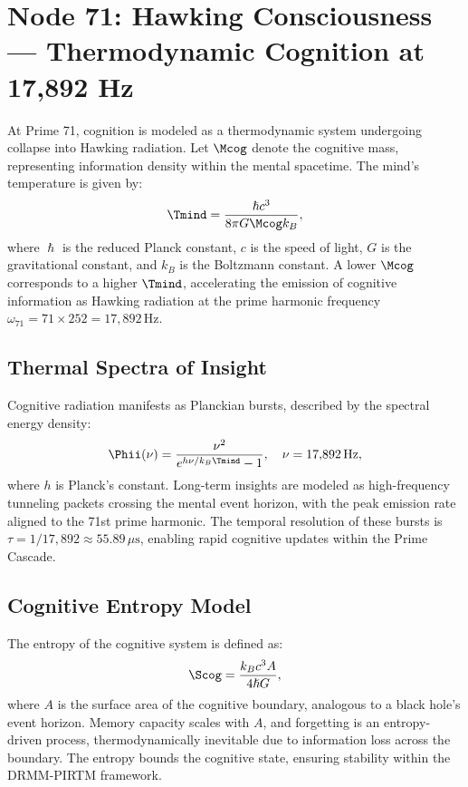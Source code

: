 \documentclass[12pt]{article}
\newcommand{\DRMM}{DRMM}
\newcommand{\PIRTM}{PIRTM}
\newcommand{\kb}{k_B}
\begin{document}
\section{Node 71: Hawking Consciousness --- Thermodynamic Cognition at 17,892 Hz}
\label{sec:hawking-consciousness}

\begin{definition}
At Prime 71, cognition is modeled as a thermodynamic system undergoing collapse into Hawking radiation. Let $\Mcog$ denote the cognitive mass, representing information density within the mental spacetime. The mind's temperature is given by:
\[
\Tmind = \frac{\hslash c^3}{8 \pi G \Mcog \kb},
\]
where $\hslash$ is the reduced Planck constant, $c$ is the speed of light, $G$ is the gravitational constant, and $\kb$ is the Boltzmann constant. A lower $\Mcog$ corresponds to a higher $\Tmind$, accelerating the emission of cognitive information as Hawking radiation at the prime harmonic frequency $\omega_{71} = 71 \times 252 = 17{,}892 \, \text{Hz}$.
\end{definition}

\subsection{Thermal Spectra of Insight}
Cognitive radiation manifests as Planckian bursts, described by the spectral energy density:
\[
\Phii(\nu) = \frac{\nu^2}{e^{h \nu / \kb \Tmind} - 1}, \quad \nu = 17{,}892 \, \text{Hz},
\]
where $h$ is Planck's constant. Long-term insights are modeled as high-frequency tunneling packets crossing the mental event horizon, with the peak emission rate aligned to the 71st prime harmonic. The temporal resolution of these bursts is $\tau = 1/17{,}892 \approx 55.89 \, \mu\text{s}$, enabling rapid cognitive updates within the Prime Cascade.

\subsection{Cognitive Entropy Model}
The entropy of the cognitive system is defined as:
\[
\Scog = \frac{\kb c^3 A}{4 \hslash G},
\]
where $A$ is the surface area of the cognitive boundary, analogous to a black hole's event horizon. Memory capacity scales with $A$, and forgetting is an entropy-driven process, thermodynamically inevitable due to information loss across the boundary. The entropy bounds the cognitive state, ensuring stability within the \DRMM{}-\PIRTM{} framework.
\end{document}
